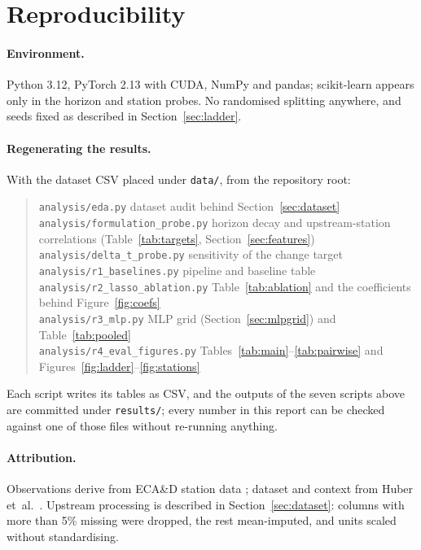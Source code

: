 \documentclass[11pt,a4paper]{article}
\begin{document}
\appendix
\section{Reproducibility}
\label{app:repro}

\paragraph{Environment.} Python 3.12, PyTorch 2.13 with CUDA, NumPy and pandas; scikit-learn appears only in the horizon and station probes. No randomised splitting anywhere, and seeds fixed as described in Section~\ref{sec:ladder}.

\paragraph{Regenerating the results.} With the dataset CSV placed under \texttt{data/}, from the repository root:
\begin{quote}
\small
\texttt{analysis/eda.py} \hfill dataset audit behind Section~\ref{sec:dataset}\\
\texttt{analysis/formulation\_probe.py} \hfill horizon decay and upstream-station correlations (Table~\ref{tab:targets}, Section~\ref{sec:features})\\
\texttt{analysis/delta\_t\_probe.py} \hfill sensitivity of the change target\\
\texttt{analysis/r1\_baselines.py} \hfill pipeline and baseline table\\
\texttt{analysis/r2\_lasso\_ablation.py} \hfill Table~\ref{tab:ablation} and the coefficients behind Figure~\ref{fig:coefs}\\
\texttt{analysis/r3\_mlp.py} \hfill MLP grid (Section~\ref{sec:mlpgrid}) and Table~\ref{tab:pooled}\\
\texttt{analysis/r4\_eval\_figures.py} \hfill Tables~\ref{tab:main}--\ref{tab:pairwise} and Figures~\ref{fig:ladder}--\ref{fig:stations}
\end{quote}
Each script writes its tables as CSV, and the outputs of the seven scripts above are committed under \texttt{results/}; every number in this report can be checked against one of those files without re-running anything.

\paragraph{Attribution.} Observations derive from ECA\&D station data \cite{kleintank2002}; dataset and context from Huber et~al.~\cite{huber2023}. Upstream processing is described in Section~\ref{sec:dataset}: columns with more than 5\% missing were dropped,
the rest mean-imputed, and units scaled without standardising.
\end{document}
